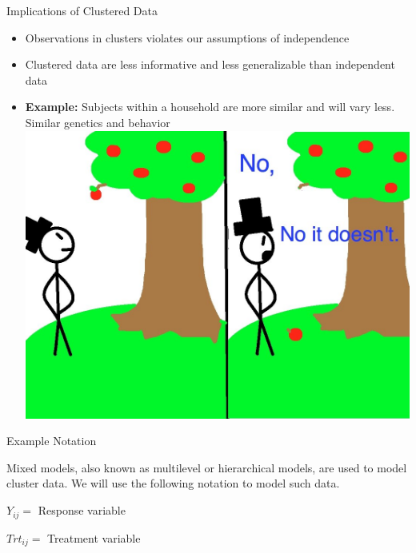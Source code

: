 \documentclass[ignorenonframetext,]{beamer}
\providecommand{\tightlist}{%
  \setlength{\itemsep}{0pt}\setlength{\parskip}{0pt}}
\begin{document}
\begin{frame}{Implications of Clustered Data}

\begin{itemize}
\tightlist
\item
  Observations in clusters violates our assumptions of independence
\item
  Clustered data are less informative and less generalizable than
  independent data
\item
  \textbf{Example:} Subjects within a household are more similar and
  will vary less. Similar genetics and behavior
  \includegraphics{img3.jpg}
\end{itemize}

\end{frame}

\begin{frame}{Example Notation}

Mixed models, also known as multilevel or hierarchical models, are used
to model cluster data. We will use the following notation to model such
data.

\(Y_{ij} =\) Response variable

\(Trt_{ij} =\) Treatment variable

\end{frame}
\end{document}
